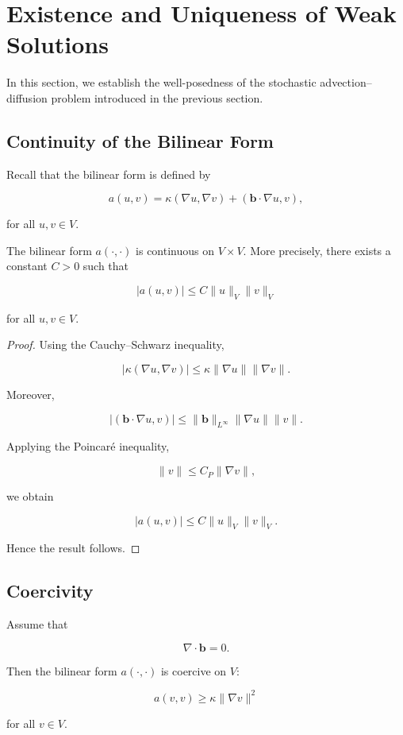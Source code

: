 \section{Existence and Uniqueness of Weak Solutions}

In this section, we establish the well-posedness of the stochastic advection--diffusion problem introduced in the previous section.

\subsection{Continuity of the Bilinear Form}

Recall that the bilinear form is defined by

\[
a(u,v)
=
\kappa(\nabla u,\nabla v)
+
(\mathbf b\cdot\nabla u,v),
\]

for all $u,v\in V$.

\begin{lemma}
The bilinear form $a(\cdot,\cdot)$ is continuous on $V\times V$. More precisely, there exists a constant $C>0$ such that

\[
|a(u,v)|
\le
C
\|u\|_V
\|v\|_V
\]

for all $u,v\in V$.
\end{lemma}

\begin{proof}
Using the Cauchy--Schwarz inequality,

\[
|\kappa(\nabla u,\nabla v)|
\le
\kappa
\|\nabla u\|
\|\nabla v\|.
\]

Moreover,

\[
|(\mathbf b\cdot\nabla u,v)|
\le
\|\mathbf b\|_{L^\infty}
\|\nabla u\|
\|v\|.
\]

Applying the Poincaré inequality,

\[
\|v\|
\le
C_P
\|\nabla v\|,
\]

we obtain

\[
|a(u,v)|
\le
C
\|u\|_V
\|v\|_V.
\]

Hence the result follows.
\end{proof}

\subsection{Coercivity}

\begin{lemma}
Assume that

\[
\nabla\cdot\mathbf b=0.
\]

Then the bilinear form $a(\cdot,\cdot)$ is coercive on $V$:

\[
a(v,v)
\ge
\kappa
\|\nabla v\|^2
\]

for all $v\in V$.
\end{lemma}

